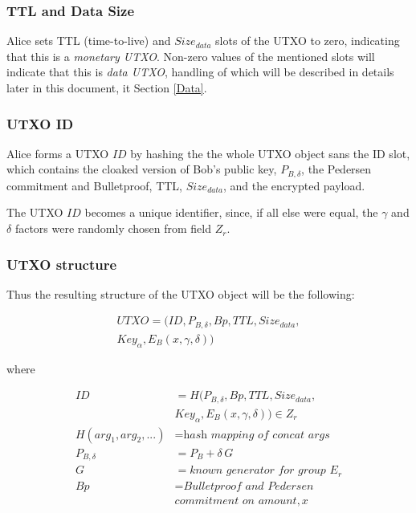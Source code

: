 \documentclass[8pt,fleqn,openany]{book}
\begin{document}
\subsubsection{TTL and Data Size} Alice sets TTL (time-to-live) and $Size_{data}$ slots of the UTXO to zero, indicating that this is a \textit{monetary UTXO}. Non-zero values of the mentioned slots will indicate that this is \textit{data UTXO}, handling of which will be described in details later in this document, it Section \ref{Data}.

\subsubsection{UTXO ID} Alice forms a UTXO $\mathit{ID}$ by hashing the the whole UTXO object sans the ID slot, which contains the cloaked version of Bob’s public key, $P_{B, \delta}$, the Pedersen commitment and Bulletproof, TTL, $Size_{data}$, and the encrypted payload.

The UTXO $\mathit{ID}$ becomes a unique identifier, since, if all else were equal, the $\gamma$ and $\delta$ factors were randomly chosen from field $Z_r$.

\subsubsection{UTXO structure}

Thus the resulting structure of the UTXO object will be the following:

\begin{multline*}
UTXO = (ID, P_{B, \delta}, Bp, TTL, Size_{data},\\
        Key_{\alpha}, E_B(x, \gamma, \delta))
\end{multline*}

where

\begin{align*}
ID &= H(P_{B, \delta}, Bp, TTL, Size_{data}, \\ 
   & Key_{\alpha}, E_B(x, \gamma, \delta)) \in Z_r \\
H(arg_1, arg_2, ...) &= \textit{hash mapping of concat args} \\
P_{B, \delta} &= P_B + \delta \, G \\
G &= \textit{known generator for group } E_r \\
Bp &= \textit{Bulletproof and Pedersen} \\
& \textit{commitment on amount}, x 
\end{align*}
\end{document}
